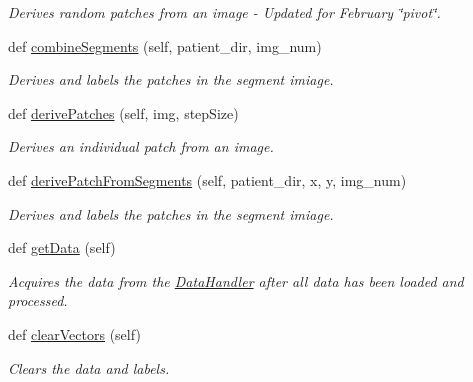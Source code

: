 \begin{DoxyCompactItemize}
\begin{DoxyCompactList}\small\item\em Derives random patches from an image -\/ Updated for February \char`\"{}pivot\char`\"{}. \end{DoxyCompactList}\item 
def \mbox{\hyperlink{classDataHandler_1_1DataHandler_a76c38ce484a10128f3330f7d57af1508}{combine\+Segments}} (self, patient\+\_\+dir, img\+\_\+num)
\begin{DoxyCompactList}\small\item\em Derives and labels the patches in the segment imiage. \end{DoxyCompactList}\item 
def \mbox{\hyperlink{classDataHandler_1_1DataHandler_a4ce184a87ec5b166dfbcfa250271de4b}{derive\+Patches}} (self, img, step\+Size)
\begin{DoxyCompactList}\small\item\em Derives an individual patch from an image. \end{DoxyCompactList}\item 
def \mbox{\hyperlink{classDataHandler_1_1DataHandler_aba20b63c301b50a420e9c57e3ba8964d}{derive\+Patch\+From\+Segments}} (self, patient\+\_\+dir, x, y, img\+\_\+num)
\begin{DoxyCompactList}\small\item\em Derives and labels the patches in the segment imiage. \end{DoxyCompactList}\item 
def \mbox{\hyperlink{classDataHandler_1_1DataHandler_a336c25a9d3bc421cb8c83cc06a146cf4}{get\+Data}} (self)
\begin{DoxyCompactList}\small\item\em Acquires the data from the \mbox{\hyperlink{classDataHandler_1_1DataHandler}{Data\+Handler}} after all data has been loaded and processed. \end{DoxyCompactList}\item 
\mbox{\label{classDataHandler_1_1DataHandler_a8b64033a8c413e3a0962cad27361fb32}} 
def \mbox{\hyperlink{classDataHandler_1_1DataHandler_a8b64033a8c413e3a0962cad27361fb32}{clear\+Vectors}} (self)
\begin{DoxyCompactList}\small\item\em Clears the data and labels. \end{DoxyCompactList}\end{DoxyCompactItemize}
